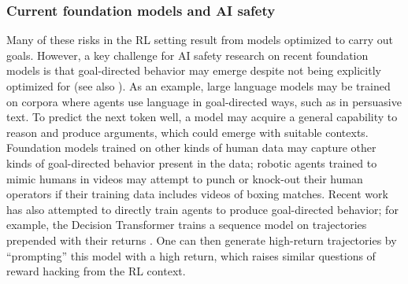 \subsubsection{Current foundation models and AI safety}

Many of these risks in the RL setting result from models optimized to carry out goals. However, a key challenge for AI safety research on recent foundation models is that goal-directed behavior may emerge despite not being explicitly optimized for (see also ). As an example, large language models may be trained on corpora where agents use language in goal-directed ways, such as in persuasive text. To predict the next token well, a model may acquire a general capability to reason and produce arguments, which could emerge with suitable contexts. Foundation models trained on other kinds of human data may capture other kinds of goal-directed behavior present in the data; \eg robotic agents trained to mimic humans in videos may attempt to punch or knock-out their human operators if their training data includes videos of boxing matches. Recent work has also attempted to directly train agents to produce goal-directed behavior; for example, the Decision Transformer trains a sequence model on trajectories prepended with their returns \citep{Srivastava2019TrainingAU, Schmidhuber2019ReinforcementLU, Chen2021DecisionTR}. One can then generate high-return trajectories by ``prompting'' this model with a high return, which raises similar questions of reward hacking from the RL context. 


